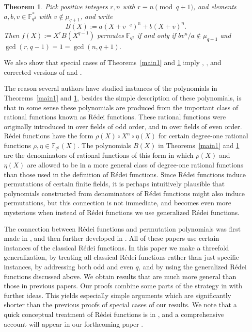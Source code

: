 \documentclass[11pt]{amsart}
\numberwithin{equation}{section}
\newtheorem{thm}[equation]{Theorem}
\theoremstyle{definition}
\newcommand{\F}{\mathbb{F}}
\begin{document}
\begin{thm}\label{main2}
Pick positive integers $r,n$ with $r\equiv n \pmod {q+1}$, and elements $a,b,v \in \F_{q^2}^*$ with $v\notin\mu_{q+1}$, and write
\[
B(X) := a (X+v^{-q})^n + b (X+v)^n.
\]
Then  $f(X):=X^r B(X^{q-1})$ permutes  $\F_{q^2}$ if and only if $bv^n/a \notin \mu_{q+1}$ and
$\gcd(r,q-1)=1=\gcd(n,q+1)$.
\end{thm}

We also show that special cases of Theorems~\ref{main1} and \ref{main2} imply \cite[Thms.~3.3 an 3.5]{WYDM}, \cite[Thms.~1.1 and 1.2]{ZR}, and corrected versions of \cite[Thms.~1 and 2]{FFLW} and \cite[Thms.~8 and 9]{PUW}.

The reason several authors have studied instances of the polynomials in Theorems~\ref{main1} and \ref{main2}, besides the simple description of these polynomials, is that in some sense these polynomials are produced from the important class of rational functions known as R\'edei functions.  These rational functions were originally introduced in \cite{R} over fields of odd order, and in \cite{N} over fields of even order.  R\'edei functions have the form $\rho(X)\circ X^n\circ\eta(X)$ for certain degree-one rational functions $\rho,\eta\in\F_{q^2}(X)$.  The polynomials $B(X)$ in Theorems~\ref{main1} and \ref{main2} are the denominators of rational functions of this form in which $\rho(X)$ and $\eta(X)$ are allowed to be in a more general class of degree-one rational functions than those used in the definition of R\'edei functions.  Since R\'edei functions induce permutations of certain finite fields, it is perhaps intuitively plausible that polynomials constructed from denominators of R\'edei functions might also induce permutations, but this connection is not immediate, and becomes even more mysterious when instead of R\'edei functions we use generalized R\'edei functions.

The connection between R\'edei functions and permutation polynomials was first made in \cite{ZR}, and then further developed in \cite{FFLW, PUW, WYDM}.  All of these papers use certain instances of the classical R\'edei functions.  In this paper we make a threefold generalization, by treating all classical R\'edei functions rather than just specific instances, by addressing both odd and even $q$, and by using the generalized R\'edei functions discussed above.  We obtain results that are much more general than those in previous papers.  
Our proofs combine some parts of the strategy in \cite{ZR} with further ideas.  This yields especially simple arguments which are significantly shorter than the previous proofs of special cases of our results.  We note that  a quick
conceptual treatment of R\'edei functions is in \cite{DZtrig}, and a
comprehensive account will appear in our forthcoming paper \cite{DZRedei}.
\end{document}
